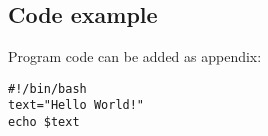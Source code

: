 \documentclass[finnish,twoside,openright]{HYgraduMLDS}
\begin{document}
\cleardoublepage %



\begin{appendices}
\myappendixtitle

\chapter{Code example\label{appendix:code}}
Program code can be added as appendix:
\begin{verbatim}
#!/bin/bash          
text="Hello World!"
echo $text
\end{verbatim}

\end{appendices}
\end{document}
